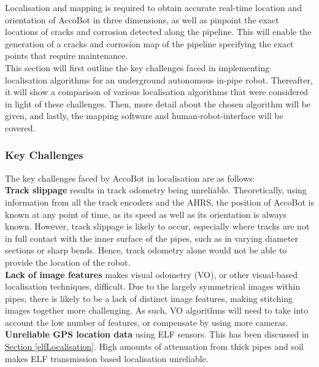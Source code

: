 \documentclass[11pt]{article}		%
\newcommand{\sectref}[1]{\hyperref[#1]{Section \ref*{#1}}}     %
\begin{document}
		Localisation and mapping is required to obtain accurate real-time location and orientation of AccoBot in three dimensions, as well as pinpoint the exact locations of cracks and corrosion detected along the pipeline. This will enable the generation of a cracks and corrosion map of the pipeline specifying the exact points that require maintenance. 
		\\\hspace*{2ex}This section will first outline the key challenges faced in implementing localisation algorithms for an underground autonomous in-pipe robot. Thereafter, it will show a comparison of various localisation algorithms that were considered in light of these challenges. Then, more detail about the chosen algorithm will be given, and lastly, the mapping software and human-robot-interface will be covered.

		\subsubsection{Key Challenges}
		
		The key challenges faced by AccoBot in localisation are as follows: 
        \\
        \hspace*{2ex}\textbf{Track slippage} results in track odometry being unreliable. Theoretically, using information from all the track encoders and the AHRS, the position of AccoBot is known at any point of time, as its speed as well as its orientation is always known. However, track slippage is likely to occur, especially where tracks are not in full contact with the inner surface of the pipes, such as in varying diameter sections or sharp bends. Hence, track odometry alone would not be able to provide the location of the robot. 
        \\
        \hspace*{2ex}\textbf{Lack of image features} makes visual odometry (VO), or other visual-based localisation techniques, difficult. Due to the largely symmetrical images within pipes, there is likely to be a lack of distinct image features, making stitching images together more challenging. As such, VO algorithms will need to take into account the low number of features, or compensate by using more cameras. 
        \\
        \hspace*{2ex}\textbf{Unreliable GPS location data} using ELF sensors. This has been discussed in \sectref{elfLocalisation}. High amounts of attenuation from thick pipes and soil makes ELF transmission based localisation unreliable. 
\end{document}

